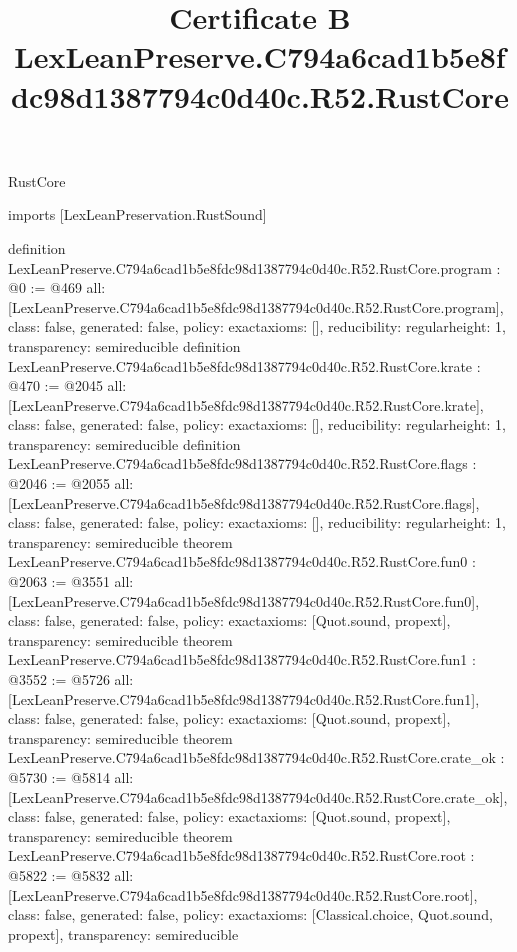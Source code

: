 \begin{lexlean}{RustCore}
\title{Certificate B LexLeanPreserve.C794a6cad1b5e8fdc98d1387794c0d40c.R52.RustCore}
\begin{coremodule}
imports [LexLeanPreservation.RustSound]

definition LexLeanPreserve.C794a6cad1b5e8fdc98d1387794c0d40c.R52.RustCore.program : @0 := @469 {
  all: [LexLeanPreserve.C794a6cad1b5e8fdc98d1387794c0d40c.R52.RustCore.program],
  class: false,
  generated: false,
  policy: exact{axioms: []},
  reducibility: regular{height: 1},
  transparency: semireducible
}
definition LexLeanPreserve.C794a6cad1b5e8fdc98d1387794c0d40c.R52.RustCore.krate : @470 := @2045 {
  all: [LexLeanPreserve.C794a6cad1b5e8fdc98d1387794c0d40c.R52.RustCore.krate],
  class: false,
  generated: false,
  policy: exact{axioms: []},
  reducibility: regular{height: 1},
  transparency: semireducible
}
definition LexLeanPreserve.C794a6cad1b5e8fdc98d1387794c0d40c.R52.RustCore.flags : @2046 := @2055 {
  all: [LexLeanPreserve.C794a6cad1b5e8fdc98d1387794c0d40c.R52.RustCore.flags],
  class: false,
  generated: false,
  policy: exact{axioms: []},
  reducibility: regular{height: 1},
  transparency: semireducible
}
theorem LexLeanPreserve.C794a6cad1b5e8fdc98d1387794c0d40c.R52.RustCore.fun0 : @2063 := @3551 {
  all: [LexLeanPreserve.C794a6cad1b5e8fdc98d1387794c0d40c.R52.RustCore.fun0],
  class: false,
  generated: false,
  policy: exact{axioms: [Quot.sound, propext]},
  transparency: semireducible
}
theorem LexLeanPreserve.C794a6cad1b5e8fdc98d1387794c0d40c.R52.RustCore.fun1 : @3552 := @5726 {
  all: [LexLeanPreserve.C794a6cad1b5e8fdc98d1387794c0d40c.R52.RustCore.fun1],
  class: false,
  generated: false,
  policy: exact{axioms: [Quot.sound, propext]},
  transparency: semireducible
}
theorem LexLeanPreserve.C794a6cad1b5e8fdc98d1387794c0d40c.R52.RustCore.crate_ok : @5730 := @5814 {
  all: [LexLeanPreserve.C794a6cad1b5e8fdc98d1387794c0d40c.R52.RustCore.crate_ok],
  class: false,
  generated: false,
  policy: exact{axioms: [Quot.sound, propext]},
  transparency: semireducible
}
theorem LexLeanPreserve.C794a6cad1b5e8fdc98d1387794c0d40c.R52.RustCore.root : @5822 := @5832 {
  all: [LexLeanPreserve.C794a6cad1b5e8fdc98d1387794c0d40c.R52.RustCore.root],
  class: false,
  generated: false,
  policy: exact{axioms: [Classical.choice, Quot.sound, propext]},
  transparency: semireducible
}


\end{coremodule}
\end{lexlean}
